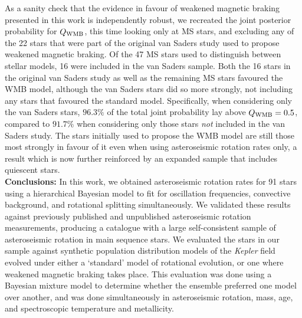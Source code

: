 \documentclass[12pt]{article}
\newcommand{\rtwo}[1]{{#1}}
\begin{document}
As a sanity check that the evidence in favour of weakened magnetic braking presented in this work is independently robust, we recreated the joint posterior probability for $Q_{\rm WMB}$, this time looking only at MS stars, and excluding any of the 22 stars that were part of the original van Saders study used to propose weakened magnetic braking. Of the 47 MS stars used to distinguish between stellar models, 16 were included in the van Saders sample. Both the 16 stars in the original van Saders study as well as the remaining MS stars favoured the WMB model, although the van Saders stars did so more strongly, not including any stars that favoured the standard model. Specifically, when considering only the van Saders stars, $96.3\%$ of the total joint probability lay above $Q_{\rm WMB} = 0.5$, compared to $91.7\%$ when considering only those stars \emph{not} included in the van Saders study. The stars initially used to propose the WMB model are still those most strongly in favour of it even when using asteroseismic rotation rates only, a result which is now further reinforced by an expanded sample that includes quiescent stars.\\


\textbf{Conclusions:} In this work, we obtained asteroseismic rotation rates for 91 stars using a hierarchical Bayesian model to fit for oscillation frequencies, convective background, and rotational splitting simultaneously. We validated these results against previously published and unpublished asteroseismic rotation measurements, producing a catalogue with a large self-consistent sample of asteroseismic rotation in main sequence stars. We evaluated the stars in our sample against synthetic population \rtwo{distribution} models of the \textit{Kepler} field evolved under either a `standard' model of rotational evolution, or one where weakened magnetic braking takes place. This evaluation was done using a Bayesian mixture model to determine whether the ensemble preferred one model over another, and was done simultaneously in asteroseismic rotation, mass, age, and spectroscopic temperature and metallicity.\\
\end{document}
